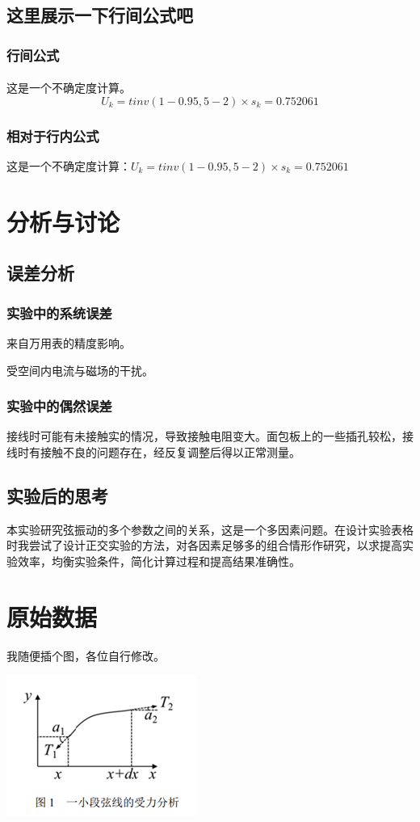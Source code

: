 \documentclass[UTF8]{ctexart}
\begin{document}
\subsection{这里展示一下行间公式吧}
\subsubsection{行间公式}
\paragraph{}这是一个不确定度计算。
\[
U_k=tinv(1-0.95,5-2)×s_k=0.752061
\]
\subsubsection{相对于行内公式}
这是一个不确定度计算：$U_k=tinv(1-0.95,5-2)×s_k=0.752061$


\section{分析与讨论}

\subsection{误差分析}

\subsubsection{实验中的系统误差}
来自万用表的精度影响。

受空间内电流与磁场的干扰。

\subsubsection{实验中的偶然误差}
接线时可能有未接触实的情况，导致接触电阻变大。面包板上的一些插孔较松，接线时有接触不良的问题存在，经反复调整后得以正常测量。

\subsection{实验后的思考}
本实验研究弦振动的多个参数之间的关系，这是一个多因素问题。在设计实验表格时我尝试了设计正交实验的方法，对各因素足够多的组合情形作研究，以求提高实验效率，均衡实验条件，简化计算过程和提高结果准确性。

\newpage
\section{原始数据}
\begin{center}
    我随便插个图，各位自行修改。
    
    
    \includegraphics{picture/example.png}
\end{center}





\end{document}
